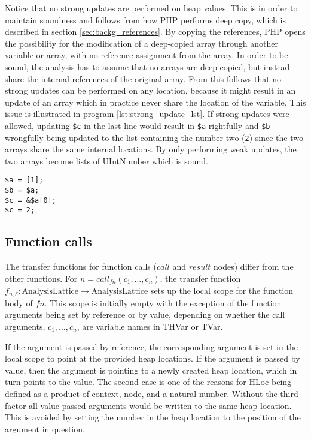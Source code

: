 Notice that no strong updates are performed on heap values. This is in order to maintain soundness and follows from how PHP performs deep copy, which is described in section \ref{sec:backg_references}. By copying the references, PHP opens the possibility for the modification of a deep-copied array through another variable or array, with no reference assignment from the array.  In order to be sound, the analysis has to assume that no arrays are deep copied, but instead share the internal references of the original array. From this follows that no strong updates can be performed on any location, because it might result in an update of an array which in practice never share the location of the variable. This issue is illustrated in program \ref{lst:strong_update_lst}. If strong updates were allowed, updating \texttt{\$c} in the last line would result in \texttt{\$a} rightfully and \texttt{\$b} wrongfully being updated to the list containing the number two (\texttt{2}) since the two arrays share the same internal locations. By only performing weak updates, the two arrays become lists of UIntNumber which is sound.
\begin{program}
\centering
\begin{lstlisting}
$a = [1];
$b = $a;
$c = &$a[0];
$c = 2;
\end{lstlisting}
\caption{  }
\label{lst:strong_update_lst}
\end{program}


\subsection{Function calls}
The transfer functions for function calls ($\mathit{call}$ and $\mathit{result}$ nodes) differ from the other functions. For $n = \mathit{call}_{\mathit{fn}}(c_1,\dots,c_n)$, the transfer function $f_{n,\delta} : \text{AnalysisLattice} \rightarrow \text{AnalysisLattice}$ sets up the local scope for the function body of $\mathit{fn}$. This scope is initially empty with the exception of the function arguments being set by reference or by value, depending on whether the call arguments, $c_1, \dots, c_n$, are variable names in THVar or TVar. 

If the argument is passed by reference, the corresponding argument is set in the local scope to point at the provided heap locations. If the argument is passed by value, then the argument is pointing to a newly created heap location, which in turn points to the value. The second case is one of the reasons for HLoc being defined as a product of context, node, and a natural number. Without the third factor all value-passed arguments would be written to the same heap-location. This is avoided by setting the number in the heap location to the position of the argument in question. 

